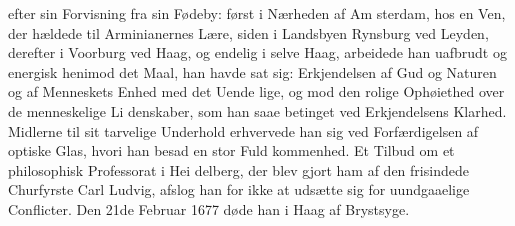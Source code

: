 \documentclass[12pt,a4paper]{book}
\begin{document}
efter sin Forvisning fra sin Fødeby: først i Nærheden af Am\-%
sterdam, hos en Ven, der hældede til Arminianernes Lære, siden
i Landsbyen Rynsburg ved Leyden, derefter i Voorburg ved
Haag, og endelig i selve Haag, arbeidede han uafbrudt og
energisk henimod det Maal, han havde sat sig: Erkjendelsen
af Gud og Naturen og af Menneskets Enhed med det Uende\-%
lige, og mod den rolige Ophøiethed over de menneskelige Li\-%
denskaber, som han saae betinget ved Erkjendelsens Klarhed.
Midlerne til sit tarvelige Underhold erhvervede han sig ved
Forfærdigelsen af optiske Glas, hvori han besad en stor Fuld\-%
kommenhed. Et Tilbud om et philosophisk Professorat i Hei\-%
delberg, der blev gjort ham af den frisindede Churfyrste Carl
Ludvig, afslog han for ikke at udsætte sig for uundgaaelige
Conflicter. Den 21de Februar 1677 døde han i Haag af
Brystsyge.
\end{document}
